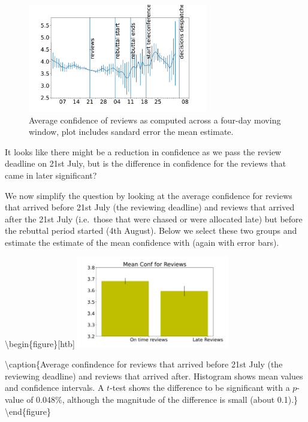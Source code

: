\begin{figure}[htb]
\includegraphics[width=0.70\textwidth]{diagrams/neurips/review-confidence-time.pdf}


\caption{Average confidence of reviews as computed across a four-day moving window, plot includes sandard error the mean estimate.}
\label{review-confidence-time}
\end{figure}

It looks like there might be a reduction in confidence as we pass the
review deadline on 21st July, but is the difference in confidence for
the reviews that came in later significant?

We now simplify the question by looking at the average confidence for
reviews that arrived before 21st July (the reviewing deadline) and
reviews that arrived after the 21st July (i.e.~those that were chased or
were allocated late) but before the rebuttal period started (4th
August). Below we select these two groups and estimate the estimate of
the mean confidence with (again with error bars).

\textbackslash begin\{figure\}{[}htb{]}
\includegraphics[width=0.50\textwidth]{diagrams/neurips/review-confidence-early-late.pdf}

\textbackslash caption\{Average confindence for reviews that arrived
before 21st July (the reviewing deadline) and reviews that arrived
after. Histogram shows mean values and confidence intervals. A
\(t\)-test shows the difference to be significant with a \(p\)-value of
0.048\%, although the magnitude of the difference is small (about
0.1).\} \label{review-confidence-early-late}
\textbackslash end\{figure\}

